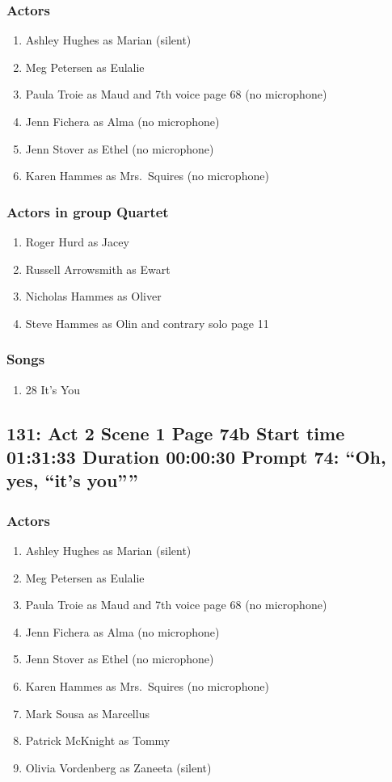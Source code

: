 \subsubsection{Actors}
\begin{enumerate}
\item Ashley Hughes as Marian (silent)
\item Meg Petersen as Eulalie
\item Paula Troie as Maud and 7th voice page 68 (no microphone)
\item Jenn Fichera as Alma (no microphone)
\item Jenn Stover as Ethel (no microphone)
\item Karen Hammes as Mrs.~Squires (no microphone)
\end{enumerate}
\subsubsection{Actors in group Quartet}
\begin{enumerate}
\item Roger Hurd as Jacey
\item Russell Arrowsmith as Ewart
\item Nicholas Hammes as Oliver
\item Steve Hammes as Olin and contrary solo page 11
\end{enumerate}

\subsubsection{Songs}
\begin{enumerate}
\item 28 It's You
\end{enumerate}
\subsection{131: Act 2 Scene 1 Page 74b Start time 01:31:33 Duration 00:00:30 Prompt 74: ``Oh, yes, ``it's you''''}

\subsubsection{Actors}
\begin{enumerate}
\item Ashley Hughes as Marian (silent)
\item Meg Petersen as Eulalie
\item Paula Troie as Maud and 7th voice page 68 (no microphone)
\item Jenn Fichera as Alma (no microphone)
\item Jenn Stover as Ethel (no microphone)
\item Karen Hammes as Mrs.~Squires (no microphone)
\item Mark Sousa as Marcellus
\item Patrick McKnight as Tommy
\item Olivia Vordenberg as Zaneeta (silent)
\end{enumerate}
